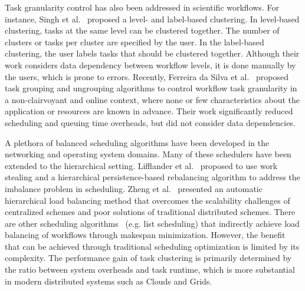 Task granularity control has also been addressed in scientific workflows. For instance, Singh et al.~\cite{Singh:2008:WTC:1341811.1341822} proposed a level- and label-based clustering. In level-based clustering, tasks at the same level can be clustered together. The number of clusters or tasks per cluster are specified by the user. In the label-based clustering, the user labels tasks that should be clustered together. Although their work considers data dependency between workflow levels, it is done manually by the users, which is prone to errors. Recently, Ferreira da Silva et al.~\cite{Ferreira-granularity-2013} proposed task grouping and ungrouping algorithms to control workflow task granularity in a non-clairvoyant and online context, where none or few characteristics about the application or resources are known in advance. Their work significantly reduced scheduling and queuing time overheads, but did not consider data dependencies.

A plethora of balanced scheduling algorithms have been developed in the networking and operating system domains. Many of these schedulers have been extended to the hierarchical setting. Lifflander et al.~\cite{Lifflander} proposed to use work stealing and a hierarchical persistence-based rebalancing algorithm to address the imbalance problem in scheduling. Zheng et al.~\cite{Zheng} presented an automatic hierarchical load balancing method that overcomes the scalability challenges of centralized schemes and poor solutions of traditional distributed schemes. There are other scheduling algorithms~\cite{Braun2001} (e.g. list scheduling) that indirectly achieve load balancing of workflows through makespan minimization. However, the benefit that can be achieved through traditional scheduling optimization is limited by its complexity. The performance gain of task clustering is primarily determined by the ratio between system overheads and task runtime, which is more substantial in modern distributed systems such as Clouds and Grids. 